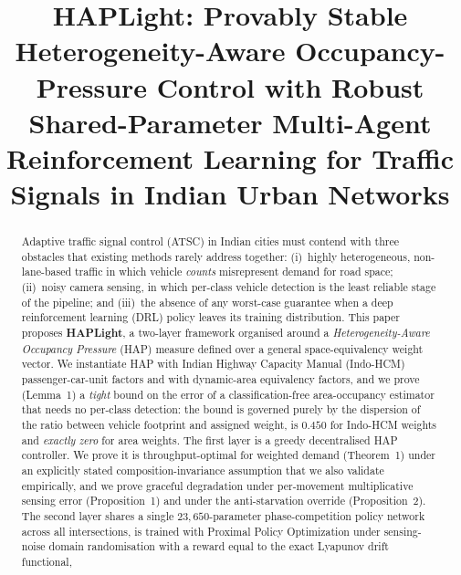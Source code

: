 \documentclass[journal]{IEEEtran}
\begin{document}
\title{HAPLight: Provably Stable Heterogeneity-Aware
Occupancy-Pressure Control with Robust Shared-Parameter Multi-Agent
Reinforcement Learning for Traffic Signals in Indian Urban Networks}

\author{
}
\maketitle

\begin{abstract}
Adaptive traffic signal control (ATSC) in Indian cities must contend with
three obstacles that existing methods rarely address together:
(i)~highly heterogeneous, non-lane-based traffic in which vehicle
\emph{counts} misrepresent demand for road space; (ii)~noisy camera
sensing, in which per-class vehicle detection is the least reliable stage
of the pipeline; and (iii)~the absence of any worst-case guarantee when a
deep reinforcement learning (DRL) policy leaves its training
distribution. This paper proposes \textbf{HAPLight}, a two-layer
framework organised around a \emph{Heterogeneity-Aware Occupancy
Pressure} (HAP) measure defined over a general space-equivalency weight
vector. We instantiate HAP with Indian Highway Capacity Manual
(Indo-HCM) passenger-car-unit factors and with dynamic-area equivalency
factors, and we prove (Lemma~1) a \emph{tight} bound on the error of a
classification-free area-occupancy estimator that needs no per-class
detection: the bound is governed purely by the dispersion of the ratio
between vehicle footprint and assigned weight, is $0.450$ for Indo-HCM
weights and \emph{exactly zero} for area weights. The first layer is a
greedy decentralised HAP controller. We prove it is throughput-optimal
for weighted demand (Theorem~1) under an explicitly stated
composition-invariance assumption that we also validate empirically, and
we prove graceful degradation under per-movement multiplicative sensing
error (Proposition~1) and under the anti-starvation override
(Proposition~2). The second layer shares a single $23{,}650$-parameter
phase-competition policy network across all intersections, is trained
with Proximal Policy Optimization under sensing-noise domain
randomisation with a reward equal to the exact Lyapunov drift functional,

\end{abstract}
\end{document}
